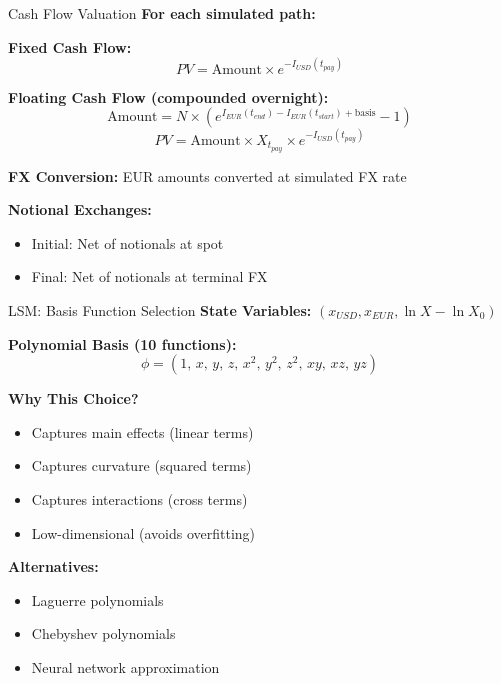 \documentclass[aspectratio=169,11pt]{beamer}
\begin{document}
\begin{frame}{Cash Flow Valuation}
\textbf{For each simulated path:}

\textbf{Fixed Cash Flow:}
\[
PV = \text{Amount} \times e^{-I_{USD}(t_{pay})}
\]

\textbf{Floating Cash Flow (compounded overnight):}
\[
\text{Amount} = N \times \left(e^{I_{EUR}(t_{end}) - I_{EUR}(t_{start}) + \text{basis}} - 1\right)
\]
\[
PV = \text{Amount} \times X_{t_{pay}} \times e^{-I_{USD}(t_{pay})}
\]

\textbf{FX Conversion:} EUR amounts converted at simulated FX rate

\textbf{Notional Exchanges:}
\begin{itemize}
    \item Initial: Net of notionals at spot
    \item Final: Net of notionals at terminal FX
\end{itemize}
\end{frame}

\begin{frame}{LSM: Basis Function Selection}
\textbf{State Variables:} $(x_{USD}, x_{EUR}, \ln X - \ln X_0)$

\textbf{Polynomial Basis (10 functions):}
\[
\phi = (1,\, x,\, y,\, z,\, x^2,\, y^2,\, z^2,\, xy,\, xz,\, yz)
\]

\textbf{Why This Choice?}
\begin{itemize}
    \item Captures main effects (linear terms)
    \item Captures curvature (squared terms)
    \item Captures interactions (cross terms)
    \item Low-dimensional (avoids overfitting)
\end{itemize}

\textbf{Alternatives:}
\begin{itemize}
    \item Laguerre polynomials
    \item Chebyshev polynomials
    \item Neural network approximation
\end{itemize}
\end{frame}
\end{document}
